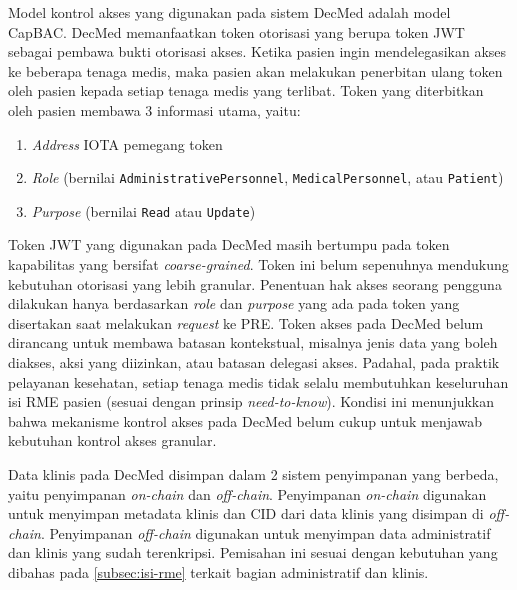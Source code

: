 
Model kontrol akses yang digunakan pada sistem DecMed adalah model CapBAC. DecMed memanfaatkan token otorisasi yang berupa token JWT sebagai pembawa bukti otorisasi akses. Ketika pasien ingin mendelegasikan akses ke beberapa tenaga medis, maka pasien akan melakukan penerbitan ulang token oleh pasien kepada setiap tenaga medis yang terlibat. Token yang diterbitkan oleh pasien membawa 3 informasi utama, yaitu:

\begin{enumerate}
    \item \textit{Address} IOTA pemegang token
    \item \textit{Role} (bernilai \texttt{AdministrativePersonnel},      \texttt{MedicalPersonnel}, atau \texttt{Patient})
    \item \textit{Purpose} (bernilai \texttt{Read} atau \texttt{Update})
\end{enumerate}

Token JWT yang digunakan pada DecMed masih bertumpu pada token kapabilitas yang bersifat \textit{coarse-grained}. Token ini belum sepenuhnya mendukung kebutuhan otorisasi yang lebih granular. Penentuan hak akses seorang pengguna dilakukan hanya berdasarkan \textit{role} dan \textit{purpose} yang ada pada token yang disertakan saat melakukan \textit{request} ke PRE. Token akses pada DecMed belum dirancang untuk membawa batasan kontekstual, misalnya jenis data yang boleh diakses, aksi yang diizinkan, atau batasan delegasi akses. Padahal, pada praktik pelayanan kesehatan, setiap tenaga medis tidak selalu membutuhkan keseluruhan isi RME pasien (sesuai dengan prinsip \textit{need-to-know}).
Kondisi ini menunjukkan bahwa mekanisme kontrol akses pada DecMed belum cukup untuk menjawab kebutuhan kontrol akses granular.


Data klinis pada DecMed disimpan dalam 2 sistem penyimpanan yang berbeda, yaitu penyimpanan \textit{on-chain} dan \textit{off-chain}. Penyimpanan \textit{on-chain} digunakan untuk menyimpan metadata klinis dan CID dari data klinis yang disimpan di \textit{off-chain}. Penyimpanan \textit{off-chain} digunakan untuk menyimpan data administratif dan klinis yang sudah terenkripsi. Pemisahan ini sesuai dengan kebutuhan yang dibahas pada \ref{subsec:isi-rme} terkait bagian administratif dan klinis.

